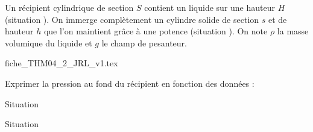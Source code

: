 \hauteurLargeurCadreReponse		{8mm}{6cm}
\typeEntrainement				{} %
\initialisationEntrainement

Un récipient cylindrique de section $S$ contient un liquide sur une hauteur $H$ (situation \reponseA). On immerge complètement un cylindre solide de section $s$ et de hauteur $h$ que l'on maintient grâce à une potence (situation \reponseB). On note $\rho$ la masse volumique du liquide et $g$ le champ de pesanteur.

\begin{center}
{fiche_THM04_2_JRL_v1.tex}
\end{center}

Exprimer la  pression au fond du récipient en fonction des données :
\debutEntrainement



\begin{enonce}
Situation \reponseA{}
\end{enonce}

\reponse{}





\begin{enonce}
Situation \reponseB{}
\end{enonce}




\finEntrainement







